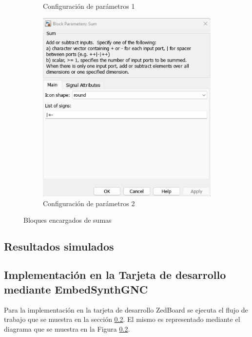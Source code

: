 \begin{figure}[htbp]
\begin{subfigure}[b]{0.45\textwidth}
        \caption{Configuración de parámetros 1}
        \label{fig:parametros_add_01}
    \end{subfigure}
    \hfill
    \begin{subfigure}[b]{0.45\textwidth}
        \centering
        \includegraphics[width=\textwidth]{fig/Capitulo5/Caso_de_estudio_PID/config_sum_02.png}
        \caption{Configuración de parámetros 2}
        \label{fig:parametros_add_02}
    \end{subfigure}

    \caption{Bloques encargados de sumas}
    \label{fig:arreglo_add}
\end{figure}

\subsection{Resultados simulados}\label{subsub:resultados_simulados_PID}

\subsection{Implementación en la Tarjeta de desarrollo mediante EmbedSynthGNC}

Para la implementación en la tarjeta de desarrollo ZedBoard se ejecuta el flujo de trabajo que se muestra en la sección \ref{}. El mismo es representado mediante el diagrama que se muestra en la Figura \ref{}.

